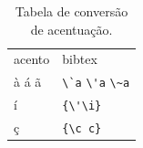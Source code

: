 

\begin{table}[htbp]
\caption{Tabela de conversão de acentuação.}
\label{tabela-acentos}

\begin{center}
\begin{tabular}{ll}\hline\hline
acento & \textsf{bibtex}\\
à á ã & \verb+\`a+ \verb+\'a+ \verb+\~a+\\
í & \verb+{\'\i}+\\
ç & \verb+{\c c}+\\
\hline\hline
\end{tabular}
\end{center}
\end{table}










